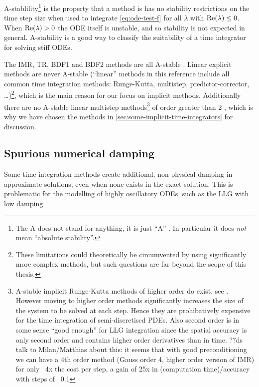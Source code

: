 A-stablility\footnote{The A does not stand for anything, it is just ``A'' \cite[40]{HairerWanner}. In particular it does \emph{not} mean ``absolute stability''.} is the property that a method is has no stability restrictions on the time step size when used to integrate \cref{eq:ode-test-f} for all $\lambda$ with $\operatorname{Re}(\lambda) \leq 0$.
When $\operatorname{Re}(\lambda) > 0$ the ODE itself is unstable, and so stability is not expected in general.
A-stability is a good way to classify the suitability of a time integrator for solving stiff ODEs.

The IMR, TR, BDF1 and BDF2 methods are all A-stable \cite[pgs. 43, 251]{HairerWanner}.
Linear explicit methods are never A-stable \cite{Nevanlinna1974} (``linear'' methods in this reference include all common time integration methods: Runge-Kutta, multistep, predictor-corrector, \ldots)\footnote{These limitations could theoretically be circumvented by using significantly more complex methods, but such questions are far beyond the scope of this thesis.}, which is the main reason for our focus on implicit methods.
Additionally there are no A-stable linear multistep methods\footnote{A-stable implicit Runge-Kutta methods of higher order do exist, see \eg \cite[73]{HairerWanner}.
However moving to higher order methods significantly increases the size of the system to be solved at each step. Hence they are prohibatively expensive for the time integration of semi-discretised PDEs.
Also second order is in some sense ``good enough'' for LLG integration since the spatial accuracy is only second order and contains higher order derivatives than in time.
??ds talk to Milan/Matthias about this: it seems that with good preconditioning we can have \eg a 4th order method (Gauss order 4, higher order version of IMR) for only ~4x the cost per step, a gain of 25x in (computation time)/accuracy with steps of ~0.1} of order greater than 2 \cite[261]{GreshoSani}, which is why we have chosen the  methods in \cref{sec:some-implicit-time-integrators} for discussion.

\subsection{Spurious numerical damping}
\label{sec:numerical-damping}

Some time integration methods create additional, non-physical damping in approximate solutions, even when none exists in the exact solution.
This is problematic for the modelling of highly oscillatory ODEs, such as the LLG with low damping.

